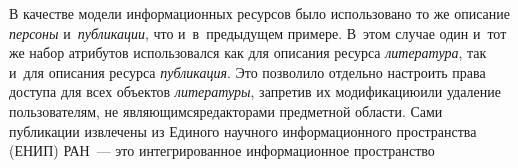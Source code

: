 \begin{multicols}{2}
    В качестве модели информационных ресурсов было использовано то же 
описание \textit{персоны} и~\textit{пуб\-ли\-ка\-ции}, что и~в~предыдущем 
примере. В~этом случае один и~тот же набор атрибутов использовался как 
для описания ресурса \textit{литература}, так и~для описания ресурса 
\textit{пуб\-ли\-ка\-ция}. Это позволило отдельно настроить права доступа для 
всех объектов \textit{литературы}, запретив их модификацию\linebreak или удаление 
пользователям, не являющимся\linebreak редакторами предметной области. Сами 
публикации извлечены из Единого научного информа\-ционного пространства 
(ЕНИП) РАН~--- это ин\-тегрированное информационное пространство\linebreak\vspace*{-12pt}

\pagebreak

\end{multicols}

\begin{figure*} %
 \vspace*{1pt}
\begin{center}
\mbox{%
\epsfxsize=160mm
}
\end{center}
\vspace*{-9pt}
 \vspace*{14pt}
\begin{center}
\mbox{%
\epsfxsize=160mm
}
\end{center}
\vspace*{-9pt}
\vspace*{12pt}
\end{figure*}


